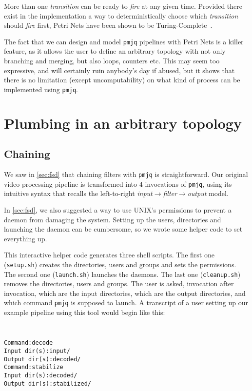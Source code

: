 \documentclass[letterpaper,twocolumn,10pt]{article}
\begin{document}
More than one \emph{transition} can be ready to \emph{fire} at any given time. Provided there exist in the implementation a way to deterministically choose which \emph{transition} should \emph{fire} first, Petri Nets have been shown to be Turing-Complete~\cite{petrituring}.

The fact that we can design and model {\tt pmjq} pipelines with Petri Nets is a killer feature, as it allows the user to define an arbitrary topology with not only branching and merging, but also loops, counters etc. This may seem too expressive, and will certainly ruin anybody's day if abused, but it shows that there is no limitation (except uncomputability) on what kind of process can be implemented using {\tt pmjq}.

\section{Plumbing in an arbitrary topology}
\label{sec:plumbing}
\subsection{Chaining}
\label{sec:chaining}
We saw in \autoref{sec:fsd} that chaining filters with {\tt pmjq} is straightforward. Our original video processing pipeline is transformed into 4 invocations of {\tt pmjq}, using its intuitive syntax that recalls the left-to-right \emph{input}$\rightarrow$\emph{filter}$\rightarrow$\emph{output} model.

In \autoref{sec:fsd}, we also suggested a way to use UNIX's permissions to prevent a daemon from damaging the system. Setting up the users, directories and launching the daemon can be cumbersome, so we wrote some helper code to set everything up.

This interactive helper code generates three shell scripts. The first one ({\tt setup.sh}) creates the directories, users and groups and sets the permissions. The second one ({\tt launch.sh}) launches the daemons. The last one ({\tt cleanup.sh}) removes the directories, users and groups. The user is asked, invocation after invocation, which are the input directories, which are the output directories, and which command {\tt pmjq} is supposed to launch. A transcript of a user setting up our example pipeline using this tool would begin like this:
{\tt \small
\begin{verbatim}
Command:decode
Input dir(s):input/
Output dir(s):decoded/
Command:stabilize
Input dir(s):decoded/
Output dir(s):stabilized/
\end{verbatim}
}
\end{document}
